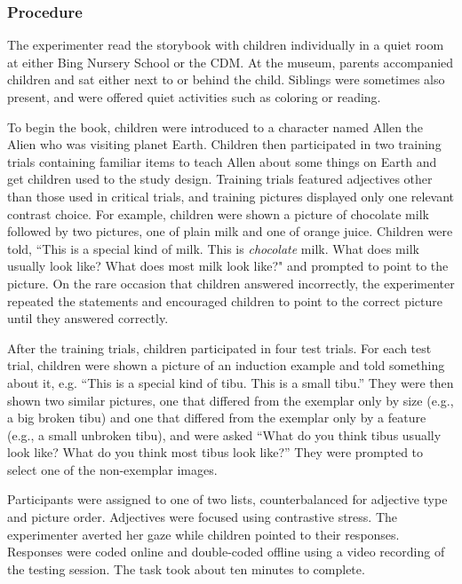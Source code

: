 \documentclass[man]{apa2}
\begin{document}
\subsubsection{Procedure}

The experimenter read the storybook with children individually in a quiet room at either Bing Nursery School or the CDM.  At the museum, parents accompanied children and sat either next to or behind the child.  Siblings were sometimes also present, and were offered quiet activities such as coloring or reading. 

To begin the book, children were introduced to a character named Allen the Alien who was visiting planet Earth.  Children then participated in two training trials containing familiar items to teach Allen about some things on Earth and get children used to the study design.  Training trials featured adjectives other than those used in critical trials, and training pictures displayed only one relevant contrast choice.  For example, children were shown a picture of chocolate milk followed by two pictures, one of plain milk and one of orange juice.  Children were told, ``This is a special kind of milk.  This is \emph{chocolate} milk.  What does milk usually look like?  What does most milk look like?" and prompted to point to the picture.  On the rare occasion that children answered incorrectly, the experimenter repeated the statements and encouraged children to point to the correct picture until they answered correctly.  

After the training trials, children participated in four test trials.  For each test trial, children were shown a picture of an induction example and told something about it, e.g. ``This is a special kind of tibu.  This is a small tibu.''  They were then shown two similar pictures, one that differed from the exemplar only by size (e.g., a big broken tibu) and one that differed from the exemplar only by a feature (e.g., a small unbroken tibu), and were asked ``What do you think tibus usually look like?  What do you think most tibus look like?'' They were prompted to select one of the non-exemplar images. 

Participants were assigned to one of two lists, counterbalanced for adjective type and picture order.  Adjectives were focused using contrastive stress. The experimenter averted her gaze while children pointed to their responses.  Responses were coded online and double-coded offline using a video recording of the testing session.  The task took about ten minutes to complete. 
\end{document}
